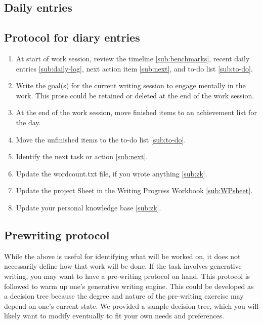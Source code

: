 \documentclass[10pt,letterpaper]{article}
\newcommand{\be}{\begin{enumerate}}
\newcommand{\ee}{\end{enumerate}}
\begin{document}
\begin{description}

\section{Daily entries}
\label{sec:dailyEntries}

\subsection{Protocol for diary entries}
\label{sub:daily-protocol}

\be
\item At start of work session, review the timeline \ref{sub:benchmarks}, recent daily entries \ref{sub:daily-log}, next action item \ref{sub:next}, and to-do list \ref{sub:to-do}.
\item Write the goal(s) for the current writing session to engage mentally in the work. This prose could be retained or deleted at the end of the work session.
\item At the end of the work session, move finished items to an achievement list for the day.
\item Move the unfinished items to the to-do list \ref{sub:to-do}.
\item Identify the next task or action \ref{sub:next}.
\item Update the wordcount.txt file, if you wrote anything \ref{sub:zk}.
\item Update the project Sheet in the Writing Progress Workbook \ref{sub:WPsheet}.
\item Update your personal knowledge base \ref{sub:zk}.
\ee


\subsection{Prewriting protocol}
\label{sub:prewritng-protocol}

While the above is useful for identifying what will be worked on, it does not necessarily define how that work will be done.
If the task involves generative writing, you may want to have a pre-writing protocol on hand.
This protocol is followed to warm up one's generative writing engine.
This could be developed as a decision tree because the degree and nature of the pre-writing exercise may depend on one's current state.
We provided a sample decision tree, which you will likely want to modify eventually to fit your own needs and preferences.




\end{description}
\end{document}
